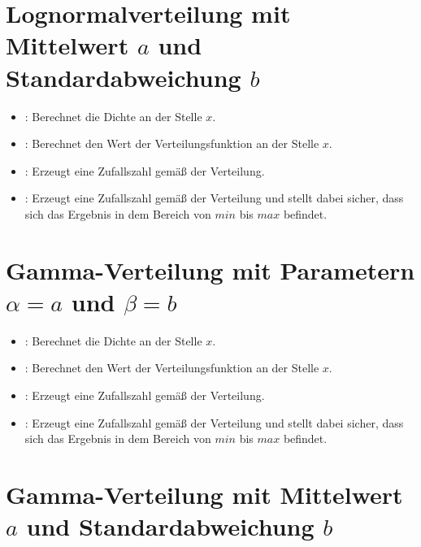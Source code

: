 \section{Lognormalverteilung mit Mittelwert \texorpdfstring{$a$}{a} und Standardabweichung \texorpdfstring{$b$}{b}}

\begin{itemize}

\item
{}:
Berechnet die Dichte an der Stelle $x$.

\item
{}:
Berechnet den Wert der Verteilungsfunktion an der Stelle $x$.

\item
{}:
Erzeugt eine Zufallszahl gemäß der Verteilung.

\item
{}:
Erzeugt eine Zufallszahl gemäß der Verteilung und stellt dabei sicher, dass sich das Ergebnis in dem Bereich von $min$ bis $max$ befindet.

\end{itemize}



\section{Gamma-Verteilung mit Parametern \texorpdfstring{$\alpha=a$}{a} und \texorpdfstring{$\beta=b$}{b}}

\begin{itemize}

\item
{}:
Berechnet die Dichte an der Stelle $x$.

\item
{}:
Berechnet den Wert der Verteilungsfunktion an der Stelle $x$.

\item
{}:
Erzeugt eine Zufallszahl gemäß der Verteilung.

\item
{}:
Erzeugt eine Zufallszahl gemäß der Verteilung und stellt dabei sicher, dass sich das Ergebnis in dem Bereich von $min$ bis $max$ befindet.

\end{itemize}



\section{Gamma-Verteilung mit Mittelwert \texorpdfstring{$a$}{a} und Standardabweichung \texorpdfstring{$b$}{b}}

